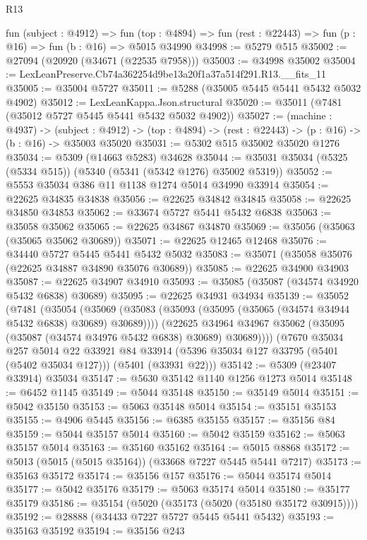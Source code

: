 \begin{lexlean}{R13}
\begin{coremodule}
  fun (subject : @4912) =>
  fun (top : @4894) => fun (rest : @22443) => fun (p : @16) => fun (b : @16) => @5015 @34990
@34998 := @5279 @515
@35002 := @27094 (@20920 (@34671 (@22535 @7958)))
@35003 := @34998 @35002
@35004 := LexLeanPreserve.Cb74a362254d9be13a20f1a37a514f291.R13.__fits_11
@35005 := @35004 @5727
@35011 := @5288 (@35005 @5445 @5441 @5432 @5032 @4902)
@35012 := LexLeanKappa.Json.structural
@35020 := @35011 (@7481 (@35012 @5727 @5445 @5441 @5432 @5032 @4902))
@35027 := (machine : @4937) ->
  (subject : @4912) -> (top : @4894) -> (rest : @22443) -> (p : @16) -> (b : @16) -> @35003 @35020
@35031 := @5302 @515 @35002 @35020 @1276
@35034 := @5309 (@14663 @5283) @34628
@35044 := @35031 @35034 (@5325 (@5334 @515)) (@5340 (@5341 (@5342 @1276) @35002 @5319))
@35052 := @5553 @35034 @386 @11 @1138 @1274 @5014 @34990 @33914
@35054 := @22625 @34835 @34838
@35056 := @22625 @34842 @34845
@35058 := @22625 @34850 @34853
@35062 := @33674 @5727 @5441 @5432 @6838
@35063 := @35058 @35062
@35065 := @22625 @34867 @34870
@35069 := @35056 (@35063 (@35065 @35062 @30689))
@35071 := @22625 @12465 @12468
@35076 := @34440 @5727 @5445 @5441 @5432 @5032
@35083 := @35071 (@35058 @35076 (@22625 @34887 @34890 @35076 @30689))
@35085 := @22625 @34900 @34903
@35087 := @22625 @34907 @34910
@35093 := @35085 (@35087 (@34574 @34920 @5432 @6838) @30689)
@35095 := @22625 @34931 @34934
@35139 := @35052
    (@7481
      (@35054
        (@35069 (@35083 (@35093 (@35095 (@35065 (@34574 @34944 @5432 @6838) @30689) @30689))))
        (@22625 @34964 @34967 @35062 (@35095 (@35087 (@34574 @34976 @5432 @6838) @30689) @30689))))
    (@7670
      @35034
      @257
      @5014
      @22
      @33921
      @84
      @33914
      (@5396 @35034 @127 @33795 (@5401 (@5402 @35034 @127)))
      (@5401 (@33931 @22)))
@35142 := @5309 (@23407 @33914) @35034
@35147 := @5630 @35142 @1140 @1256 @1273 @5014
@35148 := @6452 @1145
@35149 := @5044 @35148
@35150 := @35149 @5014
@35151 := @5042 @35150
@35153 := @5063 @35148 @5014
@35154 := @35151 @35153
@35155 := @4906 @5445
@35156 := @6385 @35155
@35157 := @35156 @84
@35159 := @5044 @35157 @5014
@35160 := @5042 @35159
@35162 := @5063 @35157 @5014
@35163 := @35160 @35162
@35164 := @5015 @8868
@35172 := @5013 (@5015 (@5015 @35164)) (@33668 @7227 @5445 @5441 @7217)
@35173 := @35163 @35172
@35174 := @35156 @157
@35176 := @5044 @35174 @5014
@35177 := @5042 @35176
@35179 := @5063 @35174 @5014
@35180 := @35177 @35179
@35186 := @35154 (@5020 (@35173 (@5020 (@35180 @35172 @30915))))
@35192 := @28888 (@34433 @7227 @5727 @5445 @5441 @5432)
@35193 := @35163 @35192
@35194 := @35156 @243

\end{coremodule}
\end{lexlean}
